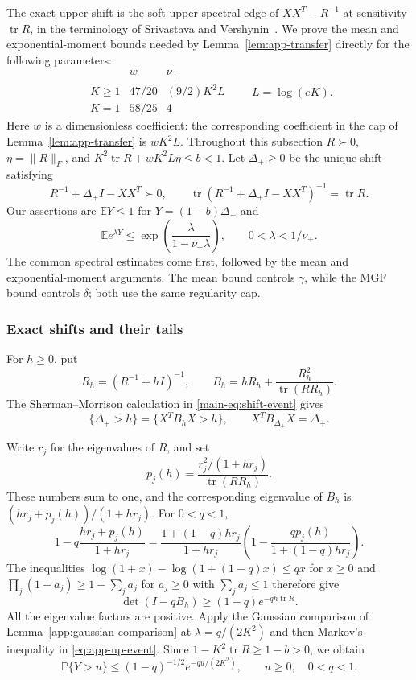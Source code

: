 \documentclass[11pt,a4paper]{article}
\newcommand{\papereqref}[1]{\eqref{main-#1}}
\newcommand{\papereqref}[1]{\textup{(\ref*{main-#1})}}
\numberwithin{equation}{section}
\begin{document}
The exact upper shift is the soft upper spectral edge of $XX^T-R^{-1}$
at sensitivity $\operatorname{tr}R$, in the terminology of
Srivastava and Vershynin~\cite[Section~1.9, equation~(1.11)]{srivastava2013covariance}.
We prove the mean and exponential-moment bounds needed by
Lemma~\ref{lem:app-transfer} directly for the following parameters:
\[
\begin{array}{c|cc}
 &w&\nu_+\\\hline
 K\ge1&47/20&(9/2)K^2L\\
 K=1&58/25&4
\end{array}
\qquad L=\log(eK).
\]
Here $w$ is a dimensionless coefficient: the corresponding coefficient
in the cap of Lemma~\ref{lem:app-transfer} is $wK^2L$.
Throughout this subsection $R\succ0$, $\eta=\|R\|_F$, and
$K^2\operatorname{tr}R+wK^2L\eta\le b<1$.
Let $\Delta_+\ge0$ be the unique shift satisfying
\[
 R^{-1}+\Delta_+I-XX^T\succ0,\qquad
 \operatorname{tr}(R^{-1}+\Delta_+I-XX^T)^{-1}=\operatorname{tr}R.
\]
Our assertions are $\mathbb EY\le1$ for $Y=(1-b)\Delta_+$ and
\begin{equation}\label{eq:app-up-mgf}
 \mathbb Ee^{\lambda Y}\le
 \exp\!\left(\frac{\lambda}{1-\nu_+\lambda}\right),
 \qquad0<\lambda<1/\nu_+.
\end{equation}
The common spectral estimates come first, followed by the mean and
exponential-moment arguments. The mean bound controls $\gamma$, while
the MGF bound controls $\delta$; both use the same regularity cap.

\subsubsection{Exact shifts and their tails}
For $h\ge0$, put
\[
 R_h=(R^{-1}+hI)^{-1},\qquad
 B_h=hR_h+\frac{R_h^2}{\operatorname{tr}(RR_h)}.
\]
The Sherman--Morrison calculation in \papereqref{eq:shift-event} gives
\begin{equation}\label{eq:app-up-event}
 \{\Delta_+>h\}=\{X^TB_hX>h\},\qquad
 X^TB_{\Delta_+}X=\Delta_+.
\end{equation}

Write $r_j$ for the eigenvalues of $R$, and set
\[
 p_j(h)=\frac{r_j^2/(1+hr_j)}{\operatorname{tr}(RR_h)}.
\]
These numbers sum to one, and the corresponding eigenvalue of $B_h$ is
$(hr_j+p_j(h))/(1+hr_j)$.
For $0<q<1$,
\[
 1-q\frac{hr_j+p_j(h)}{1+hr_j}
 =\frac{1+(1-q)hr_j}{1+hr_j}
   \left(1-\frac{qp_j(h)}{1+(1-q)hr_j}\right).
\]
The inequalities
$\log(1+x)-\log(1+(1-q)x)\le qx$ for $x\ge0$ and
$\prod_j(1-a_j)\ge1-\sum_ja_j$ for $a_j\ge0$ with
$\sum_ja_j\le1$ therefore give
\[
 \det(I-qB_h)\ge(1-q)e^{-qh\operatorname{tr}R}.
\]
All the eigenvalue factors are positive. Apply the Gaussian comparison
of Lemma~\ref{app:gaussian-comparison} at $\lambda=q/(2K^2)$ and then
Markov's inequality in \eqref{eq:app-up-event}. Since
$1-K^2\operatorname{tr}R\ge1-b>0$, we obtain
\begin{equation}\label{eq:app-up-tail-family}
 \mathbb P\{Y>u\}\le(1-q)^{-1/2}e^{-qu/(2K^2)},
 \qquad u\ge0,\quad 0<q<1.
\end{equation}
\end{document}
